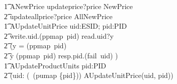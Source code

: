 \begin{circus}
        \t1 ANewPrice \circdef updateprice?price \then NewPrice \\
            \t2 \extchoice updateallprice?price \then AllNewPrice \\
        \t1 AUpdateUnitPrice \circdef uid:ESID; pid:PID \circspot \\
            \t2 write.uid.(ppmap~pid) \then read.uid?y \then \\
            \t2 (\lcircguard y = (ppmap~pid) \rcircguard \circguard \Skip \\
            \t2 \extchoice \lcircguard y \neq (ppmap~pid) \rcircguard \circguard resp.pid.(fail~uid) \then \Skip) \\
        \t1 AUpdateProductUnits \circdef pid:PID \circspot \\
            \t2 (\Interleave uid: (\dom~(pumap \rres \{pid\}))  \circspot AUpdateUnitPrice(uid, pid)) \\

\end{circus}
